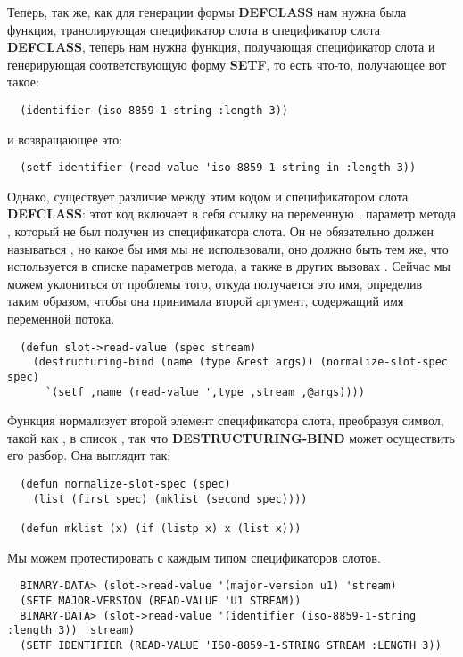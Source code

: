 Теперь, так же, как для генерации формы \textbf{DEFCLASS} нам нужна была функция,
транслирующая спецификатор слота  в спецификатор слота
\textbf{DEFCLASS}, теперь нам нужна функция, получающая спецификатор слота
 и генерирующая соответствующую форму \textbf{SETF}, то есть
что-то, получающее вот такое:

\begin{lstlisting}
  (identifier (iso-8859-1-string :length 3))
\end{lstlisting}

и возвращающее это:

\begin{lstlisting}
  (setf identifier (read-value 'iso-8859-1-string in :length 3))
\end{lstlisting}

Однако, существует различие между этим кодом и спецификатором слота \textbf{DEFCLASS}:
этот код включает в себя ссылку на переменную , параметр метода
, который не был получен из спецификатора слота. Он не обязательно должен
называться , но какое бы имя мы не использовали, оно должно быть тем же, что
используется в списке параметров метода, а также в других вызовах
. Сейчас мы можем уклониться от проблемы того, откуда получается это имя,
определив  таким образом, чтобы она принимала второй аргумент,
содержащий имя переменной потока.

\begin{lstlisting}
  (defun slot->read-value (spec stream)
    (destructuring-bind (name (type &rest args)) (normalize-slot-spec spec)
      `(setf ,name (read-value ',type ,stream ,@args))))
\end{lstlisting}

Функция  нормализует второй элемент спецификатора слота, преобразуя символ, такой как , в список , так что \textbf{DESTRUCTURING-BIND} может осуществить его разбор. Она выглядит так:

\begin{lstlisting}
  (defun normalize-slot-spec (spec)
    (list (first spec) (mklist (second spec))))

  (defun mklist (x) (if (listp x) x (list x)))
\end{lstlisting}

Мы можем протестировать  с каждым типом спецификаторов слотов.

\begin{verbatim}
  BINARY-DATA> (slot->read-value '(major-version u1) 'stream)
  (SETF MAJOR-VERSION (READ-VALUE 'U1 STREAM))
  BINARY-DATA> (slot->read-value '(identifier (iso-8859-1-string :length 3)) 'stream)
  (SETF IDENTIFIER (READ-VALUE 'ISO-8859-1-STRING STREAM :LENGTH 3))
\end{verbatim}

